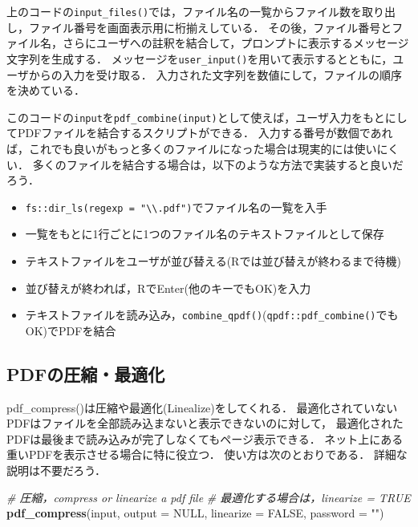 \documentclass[
]{article}
\newenvironment{Shaded}{\begin{snugshade}}{\end{snugshade}}
\newcommand{\AttributeTok}[1]{\textcolor[rgb]{0.13,0.29,0.53}{#1}}
\newcommand{\CommentTok}[1]{\textcolor[rgb]{0.56,0.35,0.01}{\textit{#1}}}
\newcommand{\ConstantTok}[1]{\textcolor[rgb]{0.56,0.35,0.01}{#1}}
\newcommand{\FunctionTok}[1]{\textcolor[rgb]{0.13,0.29,0.53}{\textbf{#1}}}
\newcommand{\NormalTok}[1]{#1}
\newcommand{\StringTok}[1]{\textcolor[rgb]{0.31,0.60,0.02}{#1}}
\providecommand{\tightlist}{%
  \setlength{\itemsep}{0pt}\setlength{\parskip}{0pt}}
\begin{document}
上のコードの\texttt{input\_files()}では，ファイル名の一覧からファイル数を取り出し，ファイル番号を画面表示用に桁揃えしている．
その後，ファイル番号とファイル名，さらにユーザへの註釈を結合して，プロンプトに表示するメッセージ文字列を生成する．
メッセージを\texttt{user\_input()}を用いて表示するとともに，ユーザからの入力を受け取る．
入力された文字列を数値にして，ファイルの順序を決めている．

このコードの\texttt{input}を\texttt{pdf\_combine(input)}として使えば，ユーザ入力をもとにしてPDFファイルを結合するスクリプトができる．
入力する番号が数個であれば，これでも良いがもっと多くのファイルになった場合は現実的には使いにくい．
多くのファイルを結合する場合は，以下のような方法で実装すると良いだろう．

\begin{itemize}
\tightlist
\item
  \texttt{fs::dir\_ls(regexp\ =\ "\textbackslash{}\textbackslash{}.pdf")}でファイル名の一覧を入手\\
\item
  一覧をもとに1行ごとに1つのファイル名のテキストファイルとして保存\\
\item
  テキストファイルをユーザが並び替える(Rでは並び替えが終わるまで待機)\\
\item
  並び替えが終われば，RでEnter(他のキーでもOK)を入力\\
\item
  テキストファイルを読み込み，\texttt{combine\_qpdf()}(\texttt{qpdf::pdf\_combine()}でもOK)でPDFを結合
\end{itemize}

\hypertarget{pdfux306eux5727ux7e2eux6700ux9069ux5316}{%
\subsection{PDFの圧縮・最適化}\label{pdfux306eux5727ux7e2eux6700ux9069ux5316}}

pdf\_compress()は圧縮や最適化(Linealize)をしてくれる．
最適化されていないPDFはファイルを全部読み込まないと表示できないのに対して，
最適化されたPDFは最後まで読み込みが完了しなくてもページ表示できる．
ネット上にある重いPDFを表示させる場合に特に役立つ．
使い方は次のとおりである．
詳細な説明は不要だろう．

\begin{Shaded}
\begin{Highlighting}[]
  \CommentTok{\# 圧縮，compress or linearize a pdf file}
  \CommentTok{\# 最適化する場合は，linearize = TRUE}
\FunctionTok{pdf\_compress}\NormalTok{(input, }\AttributeTok{output =} \ConstantTok{NULL}\NormalTok{, }\AttributeTok{linearize =} \ConstantTok{FALSE}\NormalTok{, }\AttributeTok{password =} \StringTok{""}\NormalTok{)}
\end{Highlighting}
\end{Shaded}
\end{document}
